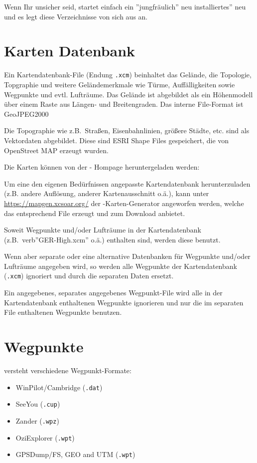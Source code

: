 Wenn Ihr unsicher seid, startet einfach ein ''jungfräulich'' neu installiertes'' \xc neu und es legt diese
Verzeichnisse von sich aus an.


\section{Karten Datenbank}\label{sec:map}

Ein Kartendatenbank-File (Endung \verb|.xcm|) beinhaltet das Gelände, die Topologie, Topgraphie und
weitere Geländemerkmale wie Türme, Auffälligkeiten sowie Wegpunkte und evtl. Lufträume.  Das
Gelände ist abgebildet als ein Höhenmodell über einem Raste aus Längen- und Breitengraden. Das interne
File-Format ist GeoJPEG2000

Die Topographie wie z.B.\ Straßen, Eisenbahnlinien, größere Städte, etc. sind als Vektordaten abgebildet.
Diese sind ESRI Shape Files gespeichert, die von OpenStreet MAP erzeugt wurden.

Die Karten können von der  \xc - Hompage heruntergeladen werden:


Um eine den eigenen Bedürfnissen angepasste Kartendatenbank herunterzuladen (z.B. andere Auflösung,
anderer Kartenausschnitt o.ä.), kann unter \url{https://mapgen.xcsoar.org/}  der \xc-Karten-Generator
angeworfen werden, welche das entsprechend File erzeugt und zum Download
anbietet.

Soweit Wegpunkte und/oder Lufträume in der Kartendatenbank (z.B.\ verb''GER-High.xcm'' o.ä.) enthalten sind,
werden diese benutzt.

Wenn aber separate oder eine alternative Datenbanken für Wegpunkte und/oder Lufträume angegeben
wird, so werden alle Wegpunkte der Kartendatenbank (\verb".xcm") ignoriert und durch die separaten
Daten ersetzt.

Ein \xc angegebenes, separates angegebenes Wegpunkt-File wird alle in der Kartendatenbank enthaltenen
Wegpunkte ignorieren und nur die im separaten File enthaltenen Wegpunkte benutzen.


\section{Wegpunkte}
\xc  versteht verschiedene Wegpunkt-Formate:

\begin{itemize}
\item WinPilot/Cambridge (\verb|.dat|)
\item SeeYou (\verb|.cup|)
\item Zander (\verb|.wpz|)
\item OziExplorer (\verb|.wpt|)
\item GPSDump/FS, GEO and UTM (\verb|.wpt|)
\end{itemize}

